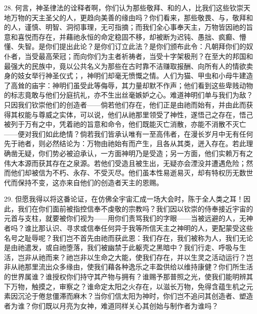 28. 何言，神圣律法的诠释者啊，你们认为那些敬拜、和的人，比我们这些钦崇天地万物的天主圣父的人，更趋向美善的缘由吗？你们看来，那些敬畏、与，敬拜和的人，谨慎、明智、洞彻事理，无可指摘；而我们全心事奉天主，万物皆因祂的旨意和喜悦而存在，并藉祂永恒的命定稳固不移，却被断为迟钝、愚拙、疯癫、懵懂、失智。是你们提出此论？是你们订立此法？是你们颁布此令：凡朝拜你们的奴仆者，当受最高荣冠；而向你们为主者祈祷者，当受十字架极刑？在至大的邦国和最强大的民族中，竟以公共名义为那些在古时靠不洁赚取报酬、向所有人的情欲卖身的妓女举行神圣仪式；，神明们却毫无愤慨之情。人们为猫、甲虫和小母牛建造了高耸的庙宇：神明们虽受此等侮辱，其力量却默不作声；他们看到这些卑贱动物的标志竟敢与他们分庭抗礼，亦不生出丝毫嫉妒之心。难道神明们单与我们为敌？只因我们钦崇他们的创造者——倘若他们存在，他们正是由祂而始有，并由此而获得其权能与尊威之实体，可以说，他们从祂那里领受了神性，遂悟己之存在，悟己被列于万有之中，凭着祂的旨意和命令，他们既能灭亡消散，亦能不消散不灭亡——便对我们如此绝情？倘若我们皆承认唯有一至高伟者，在漫长岁月中无有任何先于祂者，则必然结论为：万物由祂始有而产生，且各从其类，迸入存在。若此理确凿无疑，你们势必被迫承认，一方面神明乃是受造；另一方面，他们实赖万有之伟大本源而获其存在之泉源。若他们受造且被生出，无疑亦会湮没并遭遇危险；然而他们却被信为不朽、永存、不受灭尽。他们虽本性易逝易灭，却有特权历无数世代而保持不变，这亦来自他们的创造者天主的恩赐。\par

29. 但愿我得以将这番论证，在仿佛全宇宙汇成一场大会时，陈于全人类之耳！因此，我们在你们面前被指控信奉不虔敬的宗教吗？我们因以钦崇的侍奉接近宇宙的元首与支柱，就要被你们视为——用你们责骂我们的字眼——当被远避的人，无神者吗？谁比那认识、寻求或信奉任何异于我等所信天主之神明的人，更配蒙受这些名号之耻辱呢？我们岂不首先由祂而获此恩：我们存在，我们被称为人，我们无论是由祂遣发，或自祂堕落，我们被幽禁于此躯壳之黑暗中？我们行走、呼吸与生活，岂非从祂而来？祂岂非以生命之大能，使我们存在，并以生灵之活动运行？岂非从祂那里流出众多缘由，使我们藉各种逸乐之丰盈供给以维持康健？你们所生活的世界属谁？谁授权你们持守其产物与拥有？谁赐予那普照之光，使我们能明辨其下万物，触摸之，审察之？谁命定太阳之火存在，以滋长万物，免得含蕴生机之元素因沉沦于倦怠僵滞而麻木？当你们信太阳为神时，你们岂不追问其创造者、塑造者为谁？你们既以月亮为女神，难道同样关心其创始与制作者为谁吗？\par

